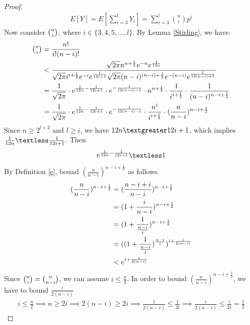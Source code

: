 \begin{proof}
\begin{align}
    \nonumber E[Y] = E[\sum_{i=3}^{l}Y_i]=\sum_{i = 3}^{l}{\binom{n}{i} p^i}
\end{align}
Now consider $\tbinom{n}{i}$, where $i\in\{3,4,5,...,l\}$. By Lemma \ref{Stirling}, we have:
\begin{align}
   \nonumber\tbinom{n}{i}&=\frac{n!}{i!(n-i)!}\\
    \nonumber&\textless \frac{\sqrt{2\pi}n^{n+\frac{1}{2}}e^{-n}e^{\frac{1}{12n}}}{\sqrt{2\pi}i^{i+\frac{1}{2}}e^{-i}e^{\frac{1}{12i+1}}\sqrt{2\pi}(n-i)^{(n-i)+\frac{1}{2}}e^{-(n-i)}e^{\frac{1}{12(n-i)+1}}}\\
    \nonumber &=\frac{1}{\sqrt{2\pi}}\cdot e^{\frac{1}{12n}-\frac{1}{12i+1}}\cdot e^{-\frac{1}{12(n-i)-1}} \cdot n^{n+\frac{1}{2}} \cdot \frac{1}{i^{i+\frac{1}{2}}} \cdot \frac{1}{(n-i)^{n-i+\frac{1}{2}}}\\
    &=\frac{1}{\sqrt{2\pi}}\cdot e^{\frac{1}{12n}-\frac{1}{12i+1}}\cdot e^{-\frac{1}{12(n-i)-1}} \cdot \frac{n^i}{i^{i+\frac{1}{2}}} \cdot (\frac{n}{n-i})^{n-i+\frac{1}{2}}\label{a}
\end{align}
Since $n\ge 2^{l+2}$ and $l\ge i$, we have $12n \textgreater 12i+1$, which implies $\frac{1}{12n} \textless \frac{1}{12i+1}$. Then
\begin{align}
     e^{\frac{1}{12n}-\frac{1}{12i+1}} \textless 1 \label{b}
\end{align}
By Definition \ref{e}, bound $(\frac{n}{n-i})^{n-i+\frac{1}{2}}$ as follows.
\begin{align}
    \nonumber (\frac{n}{n-i})^{n-i+\frac{1}{2}}
    &= (\frac{n-i+i}{n-i})^{n-i+\frac{1}{2}}\\
    \nonumber&= (1+\frac{i}{n-i})^{n-i+\frac{1}{2}}\\
    \nonumber&= (1+\frac{1}{\frac{n-i}{i}})^{n-i+\frac{1}{2}}\\
    \nonumber&= ((1+\frac{1}{\frac{n-i}{i}})^{\frac{n-i}{i}})^{i+\frac{i}{2(n-i)}}\\
    \nonumber &\textless e^{i+\frac{i}{2(n-i)}}
\end{align}
Since $\tbinom{n}{i}=\tbinom{n}{n-i}$, 
we can assume $i\le \frac{n}{2}$. 
In order to bound $(\frac{n}{n-i})^{n-i+\frac{1}{2}}$, we have to bound $\frac{i}{2(n-i)}$
\begin{align}
   \nonumber i\le \frac{n}{2} 
   \implies n \ge 2i 
   \implies 2(n-i) \ge 2i \implies \frac{1}{2(n-i)} \le \frac{1}{2i} \implies  \frac{i}{2(n-i)} \le \frac{i}{2i} =\frac{1}{2}

\end{align}
\end{proof}
